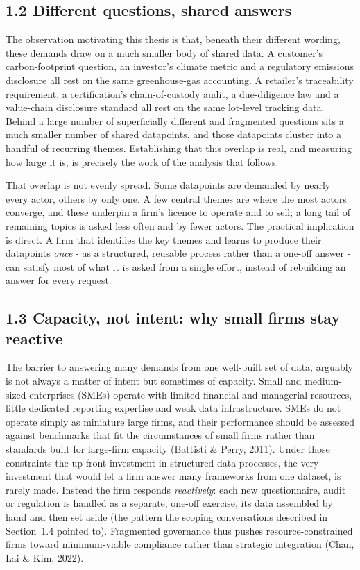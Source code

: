 \subsection{1.2 Different questions, shared
answers}\label{different-questions-shared-answers}

The observation motivating this thesis is that, beneath their different wording,
these demands draw on a much smaller body of shared data. A customer's
carbon-footprint question, an investor's climate metric and a regulatory
emissions disclosure all rest on the same greenhouse-gas accounting. A
retailer's traceability requirement, a certification's chain-of-custody audit, a
due-diligence law and a value-chain disclosure standard all rest on the same
lot-level tracking data. Behind a large number of superficially different and
fragmented questions sits a much smaller number of shared datapoints, and those
datapoints cluster into a handful of recurring themes. Establishing that this
overlap is real, and measuring how large it is, is precisely the work of the
analysis that follows.

That overlap is not evenly spread. Some datapoints are demanded by nearly every
actor, others by only one. A few central themes are where the most actors
converge, and these underpin a firm's licence to operate and to sell; a long tail
of remaining topics is asked less often and by fewer actors.
The practical implication is direct. A firm that identifies the
key themes and learns to produce their datapoints \emph{once} - as a
structured, reusable process rather than a one-off answer - can satisfy most of
what it is asked from a single effort, instead of rebuilding an answer for every
request.

\subsection{1.3 Capacity, not intent: why small firms stay
reactive}\label{why-resource-limited-firms-stay-reactive}

The barrier to answering many demands from one
well-built set of data, arguably is not always a matter of intent but sometimes of capacity. Small and
medium-sized enterprises (SMEs) operate with limited financial and managerial
resources, little dedicated reporting expertise and weak data infrastructure.
SMEs do not operate simply as miniature large firms, and their performance
should be assessed against benchmarks that fit the circumstances of small
firms rather than standards built for large-firm capacity (Battisti \&
Perry, 2011).
Under those constraints the up-front investment in
structured data processes, the very investment that would let a firm answer
many frameworks from one dataset, is rarely made. Instead the firm responds
\emph{reactively}: each new questionnaire, audit or regulation is handled as a
separate, one-off exercise, its data assembled by hand and then set aside
(the pattern the scoping conversations described in Section~1.4 pointed to).
Fragmented governance thus pushes resource-constrained firms toward
minimum-viable compliance rather than strategic integration (Chan, Lai \& Kim,
2022).

